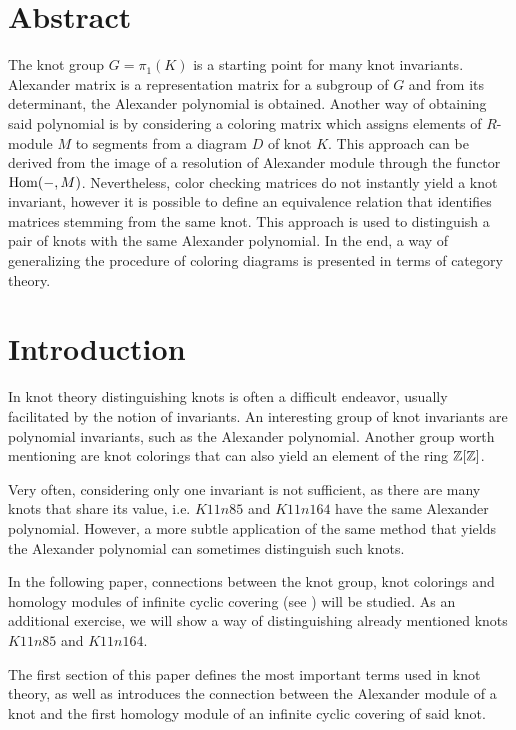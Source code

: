 \section*{Abstract}

The knot group $G=\pi_1(K)$ is a starting point for many knot invariants. Alexander matrix is a representation matrix for a subgroup of $G$ and from its determinant, the Alexander polynomial is obtained. Another way of obtaining said polynomial is by considering a coloring matrix which assigns elements of $R$-module $M$ to segments from a diagram $D$ of knot $K$. This approach can be derived from the image of a resolution of Alexander module through the functor $\operatorname{Hom}(-, M)$. Nevertheless, color checking matrices do not instantly yield a knot invariant, however it is possible to define an equivalence relation that identifies matrices stemming from the same knot. This approach is used to distinguish a pair of knots with the same Alexander polynomial. In the end, a way of generalizing the procedure of coloring diagrams is presented in terms of category theory.

\section*{Introduction}

In knot theory distinguishing knots is often a difficult endeavor, usually facilitated by the notion of invariants. An interesting group of knot invariants are polynomial invariants, such as the Alexander polynomial. Another group worth mentioning are knot colorings that can also yield an element of the ring $\operatorname{\mathbb{Z}}[\operatorname{\mathbb{Z}}]$.

Very often, considering only one invariant is not sufficient, as there are many knots that share its value, i.e. $K11n85$ and $K11n164$ have the same Alexander polynomial. However, a more subtle application of the same method that yields the Alexander polynomial can sometimes distinguish such knots.

In the following paper, connections between the knot group, knot colorings and homology modules of infinite cyclic covering (see \cite{milnor_infinite_cyclic}) will be studied. As an additional exercise, we will show a way of distinguishing already mentioned knots $K11n85$ and $K11n164$.

{\color{red}
The first section of this paper defines the most important terms used in knot theory, as well as introduces the connection between the Alexander module of a knot and the first homology module of an infinite cyclic covering of said knot. 
}


